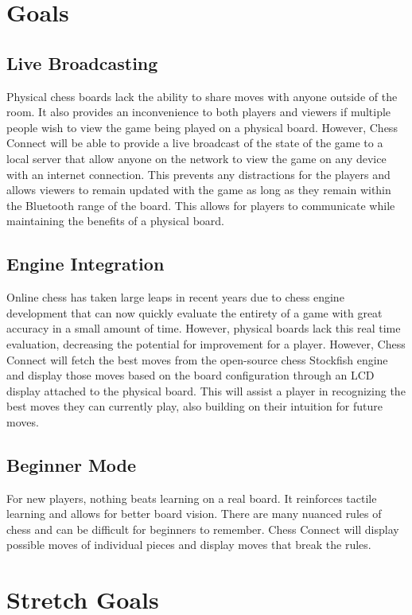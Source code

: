 \documentclass{article}
\begin{document}
\section{Goals}
\subsection{Live Broadcasting}
{Physical chess boards lack the ability to share moves with anyone outside of the room. It also provides an inconvenience to both players and viewers if multiple people wish to view the game being played on a physical board. However, Chess Connect will be able to provide a live broadcast of the state of the game to a local server that allow anyone on the network to view the game on any device with an internet connection. This prevents any distractions for the players and allows viewers to remain updated with the game as long as they remain within the Bluetooth range of the board. This allows for players to communicate while maintaining the benefits of a physical board.} 

\subsection{Engine Integration}
{Online chess has taken large leaps in recent years due to chess engine development that can now quickly evaluate the entirety of a game with great accuracy in a small amount of time. However, physical boards lack this real time evaluation, decreasing the potential for improvement for a player. However, Chess Connect will fetch the best moves from the open-source chess Stockfish engine and display those moves based on the board configuration through an LCD display attached to the physical board. This will assist a player in recognizing the best moves they can currently play, also building on their intuition for future moves.}

\subsection{Beginner Mode}
{For new players, nothing beats learning on a real board. It reinforces tactile learning and allows for better board vision. There are many nuanced rules of chess and can be difficult for beginners to remember. Chess Connect will display possible moves of individual pieces and display moves that break the rules.}

\section{Stretch Goals}
\end{document}
